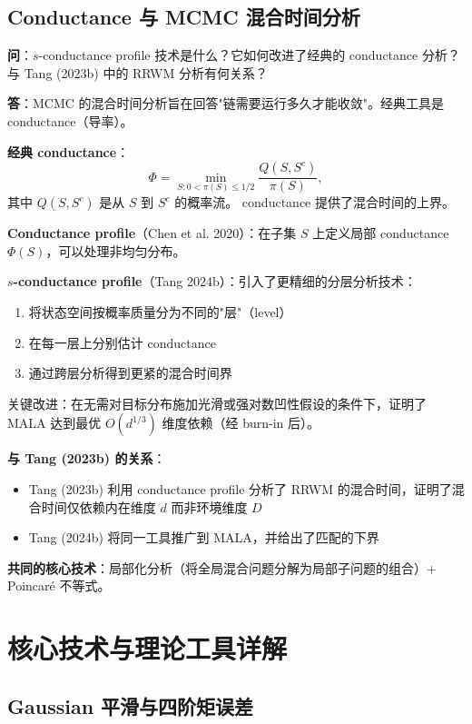 \subsection{Conductance 与 MCMC 混合时间分析}\label{sec:qa-conductance-mcmc}

\textbf{问}：$s$-conductance profile 技术是什么？它如何改进了经典的 conductance 分析？与 Tang (2023b) 中的 RRWM 分析有何关系？

\textbf{答}：MCMC 的混合时间分析旨在回答"链需要运行多久才能收敛"。经典工具是 conductance（导率）。

\textbf{经典 conductance}：
\[
\Phi = \min_{S: 0 < \pi(S) \leq 1/2} \frac{Q(S, S^c)}{\pi(S)},
\]
其中 $Q(S, S^c)$ 是从 $S$ 到 $S^c$ 的概率流。 conductance 提供了混合时间的上界。

\textbf{Conductance profile}（Chen et al. 2020）：在子集 $S$ 上定义局部 conductance $\Phi(S)$，可以处理非均匀分布。

\textbf{$s$-conductance profile}（Tang 2024b）：引入了更精细的分层分析技术：
\begin{enumerate}
    \item 将状态空间按概率质量分为不同的"层"（level）
    \item 在每一层上分别估计 conductance
    \item 通过跨层分析得到更紧的混合时间界
\end{enumerate}

关键改进：在无需对目标分布施加光滑或强对数凹性假设的条件下，证明了 MALA 达到最优 $O(d^{1/3})$ 维度依赖（经 burn-in 后）。

\textbf{与 Tang (2023b) 的关系}：
\begin{itemize}
    \item Tang (2023b) 利用 conductance profile 分析了 RRWM 的混合时间，证明了混合时间仅依赖内在维度 $d$ 而非环境维度 $D$
    \item Tang (2024b) 将同一工具推广到 MALA，并给出了匹配的下界
\end{itemize}

\textbf{共同的核心技术}：局部化分析（将全局混合问题分解为局部子问题的组合）+ Poincaré 不等式。

\section{核心技术与理论工具详解}

\subsection{Gaussian 平滑与四阶矩误差}\label{sec:qa-gaussian-smoothing}

